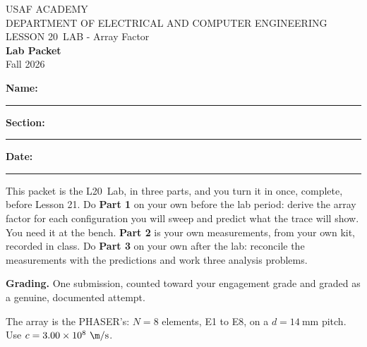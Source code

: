 \documentclass{exam}
\def\labLesson{20}
\def\thisterm{\thisTermIn}
\def\thisterm{Fall 2026}
\begin{document}
\pagestyle{headandfoot}   %



\begin{center}
USAF ACADEMY \\
DEPARTMENT OF ELECTRICAL AND COMPUTER ENGINEERING \\
LESSON \labLesson\ LAB - Array Factor \\
\textbf{Lab Packet} \\
\thisterm \\[4mm]
\end{center}

\vspace{-4pt}
\textbf{Name:} \rule[-2pt]{2.6in}{0.4pt} \hfill
\textbf{Section:} \rule[-2pt]{0.9in}{0.4pt} \hfill
\textbf{Date:} \rule[-2pt]{1.1in}{0.4pt}

\vspace{4pt}


\vspace{2pt}

This packet is the L\labLesson\ Lab, in three parts, and you turn it in once,
complete, before Lesson 21. Do \textbf{Part 1} on your own before the lab
period: derive the array factor for each configuration you will sweep and
predict what the trace will show. You need it at the bench. \textbf{Part 2} is
your own measurements, from your own kit, recorded in class. Do \textbf{Part 3}
on your own after the lab: reconcile the measurements with the predictions and
work three analysis problems.

\textbf{Grading.} One submission, counted toward your engagement grade and
graded as a genuine, documented attempt.

The array is the PHASER's: $N = 8$ elements, E1 to E8, on a $d = 14\ \text{mm}$
pitch. Use $c = 3.00\times 10^{8}\ \m/\text{s}$.
\end{document}
